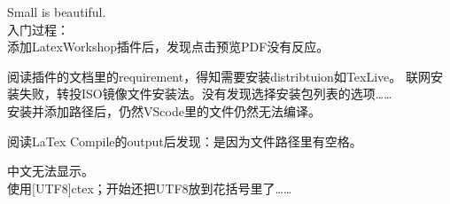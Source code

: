 ﻿\documentclass{article}
\begin{document}
Small is beautiful.\\
入门过程：\\
添加LatexWorkshop插件后，发现点击预览PDF没有反应。\par
\qquad  阅读插件的文档里的requirement，得知需要安装distribtuion如TexLive。
联网安装失败，转投ISO镜像文件安装法。没有发现选择安装包列表的选项……\\
安装并添加路径后，仍然VScode里的文件仍然无法编译。\par
 \qquad 阅读LaTex Compile的output后发现：是因为文件路径里有空格。\par
中文无法显示。\\
\quad  使用[UTF8]{ctex}；开始还把UTF8放到花括号里了……\\
\end{document}
